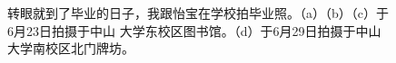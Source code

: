\documentclass[cn,11pt,chinese]{elegantbook}
\begin{document}
\begin{figure}
    \caption{转眼就到了毕业的日子，我跟怡宝在学校拍毕业照。（a）（b）（c）于6月23日拍摄于中山
    大学东校区图书馆。（d）于6月29日拍摄于中山大学南校区北门牌坊。}
\end{figure}
\end{document}
